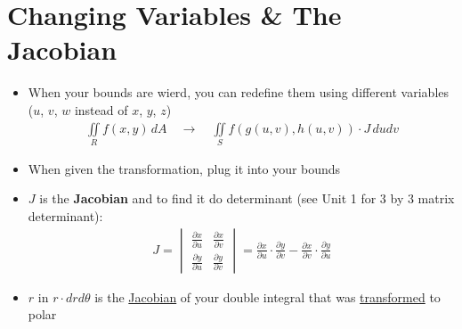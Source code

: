 \documentclass{article}
\begin{document}
\section{Changing Variables \& The Jacobian}
\begin{itemize}
  \item When your bounds are wierd, you can redefine them using different variables ($u$, $v$, $w$ instead of $x$, $y$, $z$)
  \begin{align}
    \iint\limits_R f(x,y) \, dA \quad\rightarrow\quad \iint\limits_S f(g(u,v),h(u,v))\cdot J \, dudv
  \end{align}
  \item When given the transformation, plug it into your bounds
  \item $J$ is the \textbf{Jacobian} and to find it do determinant (see Unit 1 for 3 by 3 matrix determinant):
  \begin{align}
    J =
    \begin{vmatrix}
      \frac{\partial x}{\partial u} & \frac{\partial x}{\partial v} \\
      \frac{\partial y}{\partial u} & \frac{\partial y}{\partial v}
    \end{vmatrix}
    = \frac{\partial x}{\partial u} \cdot \frac{\partial y}{\partial v} - \frac{\partial x}{\partial v} \cdot \frac{\partial y}{\partial u}
  \end{align}
  \item $r$ in $r\cdot drd\theta$ is the \underline{Jacobian} of your double integral that was \underline{transformed} to polar
\end{itemize}
\end{document}
